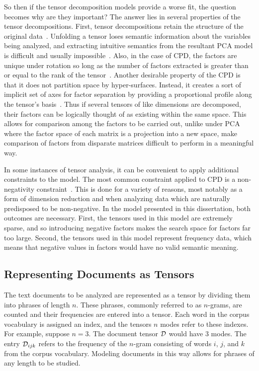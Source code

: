 \documentclass[../dissertation.tex]{subfiles}
\begin{document}
So then if the tensor decomposition models provide a worse fit, the
question becomes why are they important?  The answer lies in several
properties of the tensor decompositions.  First, tensor decompositions
retain the structure of the original data~\cite{harshman1970,
  kolda2009}.  Unfolding a tensor loses semantic information about the
variables being analyzed, and extracting intuitive semantics from the
resultant PCA model is difficult and usually
impossible~\cite{bro1997}.  Also, in the case of CPD, the factors are
unique under rotation so long as the number of factors extracted is
greater than or equal to the rank of the tensor~\cite{harshman1994}.
Another desirable property of the CPD is that it does not partition
space by hyper-surfaces.  Instead, it creates a sort of implicit set
of axes for factor separation by providing a proportional profile
along the tensor's basis~\cite{harshman1994}.  Thus if several tensors
of like dimensions are decomposed, their factors can be logically
thought of as existing within the same space.  This allows for
comparison among the factors to be carried out, unlike under PCA where
the factor space of each matrix is a projection into a new space, make
comparison of factors from disparate matrices difficult to perform in
a meaningful way.

In some instances of tensor analysis, it can be convenient to apply
additional constraints to the model.  The most common constraint
applied to CPD is a non-negativity constraint~\cite{liu2012sparse,
  bro1997, kolda2009}.  This is done for a variety of reasons, most
notably as a form of dimension reduction and when analyzing data which
are naturally predisposed to be non-negative.  In the model presented
in this dissertation, both outcomes are necessary.  First, the tensors
used in this model are extremely sparse, and so introducing negative
factors makes the search space for factors far too large.  Second, the
tensors used in this model represent frequency data, which means that
negative values in factors would have no valid semantic meaning.

\subsection{Representing Documents as Tensors}
The text documents to be analyzed are represented as a tensor by
dividing them into phrases of length $n$.  These phrases, commonly
referred to as $n$-grams, are counted and their frequencies are
entered into a tensor.  Each word in the corpus vocabulary is assigned
an index, and the tensors $n$ modes refer to these indexes.  For
example, suppose $n=3$.  The document tensor $\mathcal{D}$ would have
3 modes.  The entry $\mathcal{D}_{ijk}$ refers to the frequency of the
$n$-gram consisting of words $i$, $j$, and $k$ from the corpus
vocabulary.  Modeling documents in this way allows for phrases of any
length to be studied.
\end{document}
